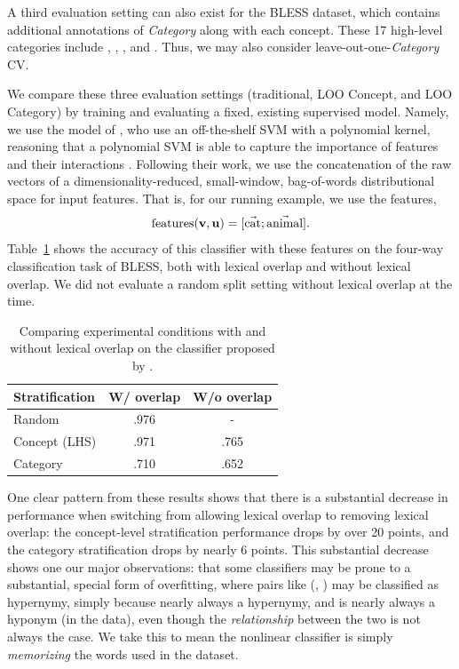A third evaluation setting can also exist for the BLESS dataset, which contains
additional annotations of {\em Category} along with each concept. These
17 high-level categories include , ,
,  and . Thus,
we may also consider leave-out-one-{\em Category} CV.

We compare these three evaluation settings (traditional, LOO Concept, and LOO
Category) by training and evaluating a fixed, existing supervised model.
Namely, we use the model of , who use an
off-the-shelf SVM with a polynomial kernel, reasoning that a polynomial SVM is
able to capture the importance of features and their interactions
\cite{cortes:1995:ml}. Following their work, we use the concatenation of the
raw vectors of a dimensionality-reduced, small-window, bag-of-words
distributional space for input features. That is, for our running
example, we use the features,
\begin{equation*}
  \mbox{features}({\mathbf{v}}, {\mathbf{u}}) = [\vec{\mbox{cat}}; \vec{\mbox{animal}}].
\end{equation*}
Table~\ref{tab:overlapresults} shows the accuracy of this
classifier with these features on the four-way classification task
of BLESS, both with lexical overlap and without lexical overlap. We did not
evaluate a random split setting without lexical overlap at the time.

\begin{table}
  \centering
  \begin{tabular}{|l|c|c|}
      \hline
      {\bf Stratification} & {\bf W/ overlap} & {\bf W/o overlap} \\
      \hline
      \hline
      Random               &   .976           &     -             \\
      Concept (LHS)        &   .971           &   .765            \\
      Category             &   .710           &   .652            \\
      \hline
  \end{tabular}
  \caption{Comparing experimental conditions with and without lexical overlap
    on the classifier proposed by .}
  \label{tab:overlapresults}
\end{table}

One clear pattern from these results shows that there is a substantial
decrease in performance when switching from allowing lexical overlap to
removing lexical overlap: the concept-level stratification performance drops
by over 20 points, and the category stratification drops by nearly 6 points.
This substantial decrease shows one our major observations: that some
classifiers may be prone to a substantial, special form of overfitting, where
pairs like (, ) may be classified as hypernymy, simply
because  nearly always a hypernymy, and  is nearly
always a hyponym (in the data), even though the {\em relationship} between
the two is not always the case. We take this to mean the nonlinear classifier
is simply {\em memorizing} the words used in the dataset.

